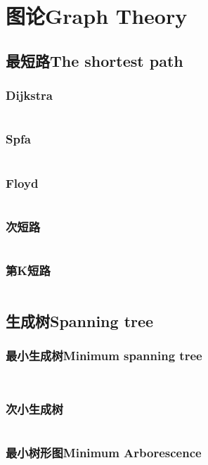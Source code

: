 \documentclass[twoside,sub3section,UTF8]{ctexart}						%
\begin{document}
\newpage
\section{图论Graph Theory}
	\subsection{最短路The shortest path}
		\subsubsection{Dijkstra}
		\inputminted{c++}{Gragh Theory/The shortest path/dijkstra.cpp}
		\subsubsection{Spfa}
		\inputminted{c++}{Gragh Theory/The shortest path/spfa.cpp}
		\subsubsection{Floyd}
		\inputminted{c++}{Gragh Theory/The shortest path/floyd.cpp}
		\subsubsection{次短路}
		\inputminted{c++}{Gragh Theory/The shortest path/secdij.cpp}
		\subsubsection{第K短路}
		\inputminted{c++}{Gragh Theory/The shortest path/Astar.cpp}

	\subsection{生成树Spanning tree}
		\subsubsection{最小生成树Minimum spanning tree}
		\inputminted{c++}{Gragh Theory/MST/kruskal.cpp}
		\inputminted{c++}{Gragh Theory/MST/prim.cpp}
		\subsubsection{次小生成树}
		\inputminted{c++}{Gragh Theory/MST/secmst.cpp}
		\subsubsection{最小树形图Minimum Arborescence}
		
\end{document}
